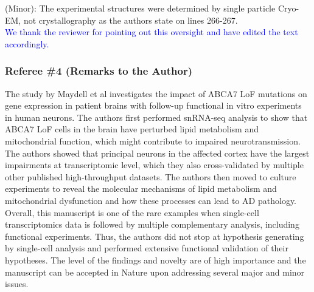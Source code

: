 \documentclass[12pt]{article}
\begin{document}
(Minor): The experimental structures were determined by single particle Cryo-EM, not crystallography as the authors state on lines 266-267.\\
\textcolor{blue}{We thank the reviewer for pointing out this oversight and have edited the text accordingly.}






































%
 \clearpage
\subsubsection*{Referee \#4 (Remarks to the Author)}

The study by Maydell et al investigates the impact of ABCA7 LoF mutations on gene expression in patient brains with follow-up functional in vitro experiments in human neurons. The authors first performed snRNA-seq analysis to show that ABCA7 LoF cells in the brain have perturbed lipid metabolism and mitochondrial function, which might contribute to impaired neurotransmission. The authors showed that principal neurons in the affected cortex have the largest impairments at transcriptomic level, which they also cross-validated by multiple other published high-throughput datasets. The authors then moved to culture experiments to reveal the molecular mechanisms of lipid metabolism and mitochondrial dysfunction and how these processes can lead to AD pathology. Overall, this manuscript is one of the rare examples when single-cell transcriptomics data is followed by multiple complementary analysis, including functional experiments. Thus, the authors did not stop at hypothesis generating by single-cell analysis and performed extensive functional validation of their hypotheses. The level of the findings and novelty are of high importance and the manuscript can be accepted in Nature upon addressing several major and minor issues.
\end{document}
